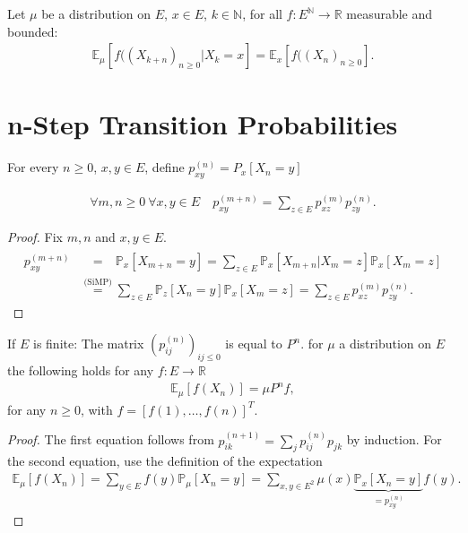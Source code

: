 \begin{cor}
Let $\mu$ be a  distribution on $E$, $x \in E$, $k \in \mathbb{N}$, for all $f: E^{\mathbb{N}} \to \mathbb{R}$ measurable and bounded:
\begin{align}
	\boxed{	\mathbb{E}_\mu \left[ f((X_{k+n})_{n \geq 0} | X_k =x \right] = \mathbb{E} _x \left[ f((X_n)_{n \geq 0} \right] .}  
\end{align}
\end{cor}

\noindent
\section{n-Step Transition Probabilities}
\begin{defn}
	For every $n\geq0$, $x, y \in E$, define $p_{xy}^{(n)}=P_x[X_n=y]$
\end{defn}

\begin{prop}
\begin{align}
	\forall m,n \geq 0 \ \forall x,y \in E \quad \boxed{ p_{xy}^{(m+n)}= \sum_{z \in E} p_{xz}^{(m)}p_{zy}^{(n)}.}
\end{align}
	
\end{prop}
\begin{proof}
Fix $m,n$ and $x,y \in E$.
	\begin{align}
		p_{xy}^{(m+n)} &\stackrel{\phantom{\textrm{(SiMP)}}}{=} 
			\mathbb{P}_{x} \left[ X_{m+n}=y \right] =
			\sum_{z \in E}^{} \mathbb{P}_{x} \left[ X_{m+n} | X_m = z \right] \mathbb{P}_{x} \left[ X_m = z \right] \\
		&\stackrel{\textrm{(SiMP)}}{=} \sum_{z \in E}^{} \mathbb{P}_{z} \left[ X_n=y \right] \mathbb{P}_{x} \left[ X_m=z \right] = \sum_{z \in E}^{} p_{xz}^{(m)} p_{zy}^{(n)}  	
	.\end{align}
	
\end{proof}


\begin{prop}[]
	If $E$ is finite:
The matrix $(p_{ij}^{(n)})_{ij \leq 0}$ is equal to $P^n$. for $\mu$ a distribution on $E$ the following holds for any $f:E \to \mathbb{R}$
	\begin{align}
	\mathbb{E}_{\mu} \left[ f(X_n) \right] = \mu P^n f
,\end{align}
for any $n\geq 0$, with $f = [f(1), \ldots ,f(n)]^T$.
\end{prop}
\begin{proof}
	The first equation follows from $p_{ik}^{(n+1)}= \sum_{j}^{} p_{ij}^{(n)}p_{jk}$ by induction. For the second equation, use the definition of the expectation
\begin{align}
	\mathbb{E}_{\mu } \left[ f(X_n) \right]  = \sum_{y \in E}^{}  f(y) \mathbb{P}_{\mu } \left[ X_n = y \right] = \sum_{x,y \in E^2}^{}  \mu (x) \underbrace{\mathbb{P}_{x} \left[ X_n =y \right]}_{=p_{xy}^{(n)}} f(y).
\end{align}
\end{proof}


